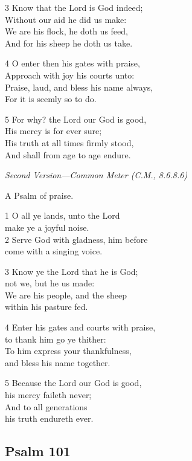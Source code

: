 3 Know that the Lord is God indeed;\\
Without our aid he did us make:\\
We are his flock, he doth us feed,\\
And for his sheep he doth us take.

4 O enter then his gates with praise,\\
Approach with joy his courts unto:\\
Praise, laud, and bless his name always,\\
For it is seemly so to do.

5 For why? the Lord our God is good,\\
His mercy is for ever sure;\\
His truth at all times firmly stood,\\
And shall from age to age endure.

\emph{Second Version---Common Meter (C.M., 8.6.8.6)}

A Psalm of praise.

1 O all ye lands, unto the Lord\\
make ye a joyful noise.\\
2 Serve God with gladness, him before\\
come with a singing voice.

3 Know ye the Lord that he is God;\\
not we, but he us made:\\
We are his people, and the sheep\\
within his pasture fed.

4 Enter his gates and courts with praise,\\
to thank him go ye thither:\\
To him express your thankfulness,\\
and bless his name together.

5 Because the Lord our God is good,\\
his mercy faileth never;\\
And to all generations\\
his truth endureth ever.

\begin{center}
\quad{}\quad{}
\end{center}

\subsection*{Psalm 101}

